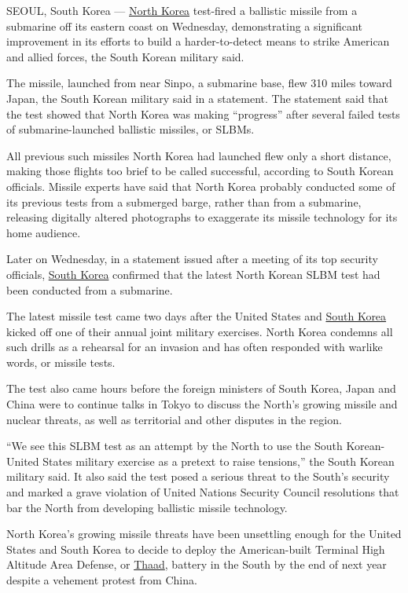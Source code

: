 SEOUL, South Korea ---
\href{http://www.nytimes.com/topic/destination/north-korea?8qa}{North
Korea} test-fired a ballistic missile from a submarine off its eastern
coast on Wednesday, demonstrating a significant improvement in its
efforts to build a harder-to-detect means to strike American and allied
forces, the South Korean military said.

The missile, launched from near Sinpo, a submarine base, flew 310 miles
toward Japan, the South Korean military said in a statement. The
statement said that the test showed that North Korea was making
``progress'' after several failed tests of submarine-launched ballistic
missiles, or SLBMs.

All previous such missiles North Korea had launched flew only a short
distance, making those flights too brief to be called successful,
according to South Korean officials. Missile experts have said that
North Korea probably conducted some of its previous tests from a
submerged barge, rather than from a submarine, releasing digitally
altered photographs to exaggerate its missile technology for its home
audience.

Later on Wednesday, in a statement issued after a meeting of its top
security officials,
\href{http://topics.nytimes.com/top/news/international/countriesandterritories/southkorea/index.html?inline=nyt-geo}{South
Korea} confirmed that the latest North Korean SLBM test had been
conducted from a submarine.

The latest missile test came two days after the United States and
\href{http://www.nytimes.com/topic/destination/south-korea?8qa}{South
Korea} kicked off one of their annual joint military exercises. North
Korea condemns all such drills as a rehearsal for an invasion and has
often responded with warlike words, or missile tests.

The test also came hours before the foreign ministers of South Korea,
Japan and China were to continue talks in Tokyo to discuss the North's
growing missile and nuclear threats, as well as territorial and other
disputes in the region.

``We see this SLBM test as an attempt by the North to use the South
Korean-United States military exercise as a pretext to raise tensions,''
the South Korean military said. It also said the test posed a serious
threat to the South's security and marked a grave violation of United
Nations Security Council resolutions that bar the North from developing
ballistic missile technology.

North Korea's growing missile threats have been unsettling enough for
the United States and South Korea to decide to deploy the American-built
Terminal High Altitude Area Defense, or
\href{http://www.nytimes.com/2016/07/08/world/asia/south-korea-and-us-agree-to-deploy-missile-defense-system.html}{Thaad},
battery in the South by the end of next year despite a vehement protest
from China.

